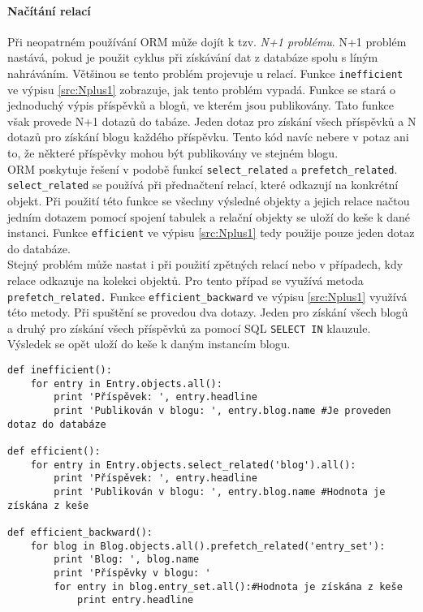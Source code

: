\documentclass[ing,male,java,dept456]{diploma}						%
\begin{document}
\paragraph{Načítání relací} 
\label{par:N+1}
Při neopatrném používání ORM může dojít k tzv. \textit{N+1 problému}. N+1 problém nastává, pokud je použit cyklus při získávání dat z databáze spolu s líným nahráváním. Většinou se tento problém projevuje u relací. Funkce \lstinline[style=custompython]|inefficient| ve výpisu \ref{src:Nplus1} zobrazuje, jak tento problém vypadá. Funkce se stará o jednoduchý výpis příspěvků a blogů, ve kterém jsou publikovány. Tato funkce však provede N+1 dotazů do tabáze. Jeden dotaz pro získání všech příspěvků a N dotazů pro získání blogu každého příspěvku. Tento kód navíc nebere v potaz ani to, že některé příspěvky mohou být publikovány ve stejném blogu. \\
ORM poskytuje řešení v podobě funkcí \lstinline[style=custompython]|select_related| a \lstinline[style=custompython]|prefetch_related|. \\ 
\lstinline[style=custompython]|select_related| se používá při přednačtení relací, které odkazují na konkrétní objekt. Při použití této funkce se všechny výsledné objekty a jejich relace načtou jedním dotazem pomocí spojení tabulek a relační objekty se uloží do keše k dané instanci. Funkce \lstinline[style=custompython]|efficient| ve výpisu \ref{src:Nplus1} tedy použije pouze jeden dotaz do databáze. \\
Stejný problém může nastat i při použití zpětných relací nebo v případech, kdy relace odkazuje na kolekci objektů. Pro tento případ se využívá metoda \lstinline[style=custompython]|prefetch_related.| Funkce \lstinline[style=custompython]|efficient_backward| ve výpisu \ref{src:Nplus1} využívá této metody. Při spuštění se provedou dva dotazy. Jeden pro získání všech blogů a druhý pro získání všech příspěvků za pomocí SQL \lstinline[style=custompython]|SELECT IN| klauzule. Výsledek se opět uloží do keše k daným instancím blogu. 

\begin{lstlisting}[style=custompython, label=src:Nplus1, caption={N+1 problém a jeho řešení v Django ORM}]
def inefficient():
	for entry in Entry.objects.all():
		print 'Příspěvek: ', entry.headline
		print 'Publikován v blogu: ', entry.blog.name #Je proveden dotaz do databáze
		
def efficient():
	for entry in Entry.objects.select_related('blog').all():
		print 'Příspěvek: ', entry.headline
		print 'Publikován v blogu: ', entry.blog.name #Hodnota je získána z keše
		
def efficient_backward():
	for blog in Blog.objects.all().prefetch_related('entry_set'):
		print 'Blog: ', blog.name
		print 'Příspěvky v blogu: '
		for entry in blog.entry_set.all():#Hodnota je získána z keše
			print entry.headline
\end{lstlisting}
\end{document}
